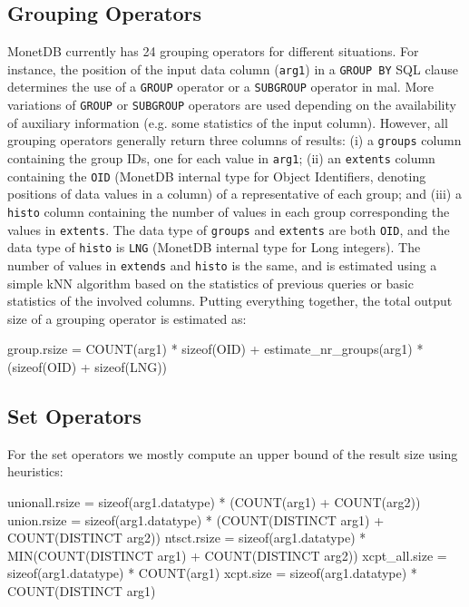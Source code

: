 \documentclass[conference]{IEEEtran}
\def\Skip{\par\medskip\nobreak\noindent}
\begin{document}
\subsection{Grouping Operators}
MonetDB currently has 24 grouping operators for different situations.
For instance, the position of the input data column (\texttt{\small arg1}) in a \texttt{\small GROUP BY} SQL clause determines the use of a \texttt{\small GROUP} operator or a \texttt{\small SUBGROUP} operator in {\sc mal}.
More variations of \texttt{\small GROUP} or \texttt{\small SUBGROUP} operators are used depending on the availability of auxiliary information (e.g. some statistics of the input column).
However, all grouping operators generally return three columns of results: (i) a \texttt{\small groups} column containing the group IDs, one for each value in \texttt{\small arg1}; (ii) an \texttt{\small extents} column containing the \texttt{\small OID} (MonetDB internal type for Object Identifiers, denoting positions of data values in a column) of a representative of each group; and (iii) a \texttt{\small histo} column containing the number of values in each group corresponding the values in \texttt{\small extents}.
The data type of \texttt{\small groups} and \texttt{\small extents} are both \texttt{\small OID}, and the data type of \texttt{\small histo} is \texttt{\small LNG} (MonetDB internal type for Long integers).
The number of values in \texttt{\small extends} and \texttt{\small histo} is the same, and is estimated using a simple kNN algorithm based on the statistics of previous queries or basic statistics of the involved columns.
Putting everything together, the total output size of a grouping operator is estimated as:
\begin{verb}
group.rsize = COUNT(arg1) * sizeof(OID) +
              estimate_nr_groups(arg1) * (sizeof(OID) + sizeof(LNG))
\end{verb}

\subsection{Set Operators}
For the set operators we mostly compute an upper bound of the result size using heuristics:
\begin{verb}
unionall.rsize = sizeof(arg1.datatype) * (COUNT(arg1) + COUNT(arg2))
union.rsize    = sizeof(arg1.datatype) *
                 (COUNT(DISTINCT arg1) + COUNT(DISTINCT arg2))
ntsct.rsize    = sizeof(arg1.datatype) *
                 MIN(COUNT(DISTINCT arg1) + COUNT(DISTINCT arg2))
xcpt_all.size  = sizeof(arg1.datatype) * COUNT(arg1)
xcpt.size      = sizeof(arg1.datatype) * COUNT(DISTINCT arg1)
\end{verb}
\end{document}
